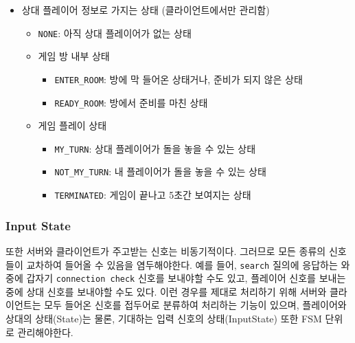 \documentclass[a4paper, 10pt]{article}
\begin{document}
\begin{itemize}
\begin{itemize}
\begin{itemize}
    \end{itemize}
  \end{itemize}
  \item 상대 플레이어 정보로 가지는 상태 (클라이언트에서만 관리함)
  \begin{itemize}
    \item \texttt{NONE}: 아직 상대 플레이어가 없는 상태
    \item 게임 방 내부 상태
    \begin{itemize}
      \item \texttt{ENTER\_ROOM}: 방에 막 들어온 상태거나, 준비가 되지 않은 상태
      \item \texttt{READY\_ROOM}: 방에서 준비를 마친 상태
    \end{itemize}
    \item 게임 플레이 상태
    \begin{itemize}
      \item \texttt{MY\_TURN}: 상대 플레이어가 돌을 놓을 수 있는 상태
      \item \texttt{NOT\_MY\_TURN}: 내 플레이어가 돌을 놓을 수 있는 상태
      \item \texttt{TERMINATED}: 게임이 끝나고 5초간 보여지는 상태
    \end{itemize}
  \end{itemize}
\end{itemize}

\subsubsection{Input State}
또한 서버와 클라이언트가 주고받는 신호는 비동기적이다. 그러므로 모든 종류의 신호들이
교차하여 들어올 수 있음을 염두해야한다. 예를 들어, \texttt{search} 질의에
응답하는 와중에 갑자기 \texttt{connection check} 신호를 보내야할 수도 있고,
플레이어 신호를 보내는 중에 상대 신호를 보내야할 수도 있다. 이런 경우를 제대로
처리하기 위해 서버와 클라이언트는 모두 들어온 신호를 접두어로 분류하여 처리하는
기능이 있으며, 플레이어와 상대의 상태(State)는 물론, 기대하는 입력 신호의
상태(InputState) 또한 FSM 단위로 관리해야한다.
\end{document}
